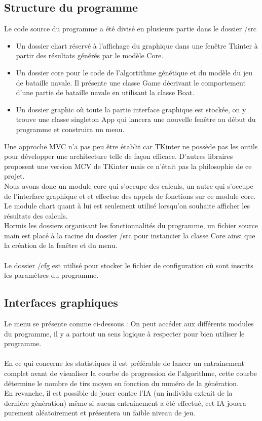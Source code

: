\documentclass[12pt]{report}
\begin{document}
	\subsection{Structure du programme}
	Le code source du programme a été divisé en plusieurs partie dans le dossier /src
	\begin{itemize}
		\item Un dossier chart réservé à l'affichage du graphique dans une fenêtre Tkinter à partir des résultats générés par le modèle Core.
		\item Un dossier core pour le code de l'algortithme génétique et du modèle du jeu de bataille navale. Il présente une classe Game décrivant le comportement d'une partie de bataille navale en utilisant la classe Boat.
		\item Un dossier graphic où toute la partie interface graphique est stockée, on y trouve une classe singleton App qui lancera une nouvelle fenêtre au début du programme et construira un menu.
	\end{itemize}
	Une approche MVC n'a pas peu être établit car TKinter ne possède pas les outils pour développer une architecture telle de façon efficace. D'autres libraires proposent une version MCV de TKinter mais ce n'était pas la philosophie de ce projet.\\
	Nous avons donc un module core qui s'occupe des calculs, un autre qui s'occupe de l'interface graphique et et effectue des appels de fonctions sur ce module core. Le module chart quant à lui est seulement utilisé lorsqu'on souhaite afficher les résultats des calculs.\\
	Hormis les dossiers organisant les fonctionnalités du programme, un fichier source main est placé à la racine du dossier /src pour instancier la classe Core ainsi que la création de la fenêtre et du menu.\\\\
	Le dossier /cfg est utilisé pour stocker le fichier de configuration où sont inscrits les paramètres du programme.\\
	\newpage
	\subsection{Interfaces graphiques}
	Le menu se présente comme ci-dessous :
	On peut accéder aux différents modules du programme, il y a partout un sens logique à respecter pour bien utiliser le programme.\\\\
	En ce qui concerne les statistiques il est préférable de lancer un entrainement complet avant de visualiser la courbe de progression de l'algorithme, cette courbe détermine le nombre de tirs moyen en fonction du numéro de la génération.\\
	En revanche, il est possible de jouer contre l'IA (un individu extrait de la dernière génération) même si aucun entrainement a été effectué, cet IA jouera purement aléatoirement et présentera un faible niveau de jeu.\\
	
\end{document}
